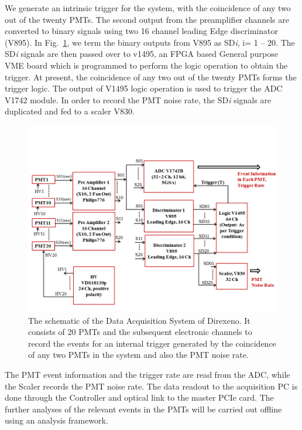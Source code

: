 We generate an intrinsic trigger for the system, 
with the coincidence of any two out of the twenty PMTs. The second output from the 
preamplifier channels are converted to binary signals using two 16 channel leading 
Edge discriminator (V895). In Fig.~\ref{Fig:DAQscheme}, we term the binary 
outputs from V895 as SD{\it i}, i= 1 -- 20. The SD{\it i} signals are then passed over to 
v1495, an FPGA based General purpose VME board which is programmed to perform the 
logic operation to obtain the trigger. At present, the coincidence of any two out 
of the twenty PMTs forms the trigger logic. The output of V1495 logic operation is 
used to trigger the ADC V1742 module. In order to record the PMT noise rate, the 
SD{\it i} signals are duplicated and fed to a scaler V830.


\begin{figure}
   \centering
   \includegraphics[width=\textwidth]{DAQscheme.png}
   \caption{The schematic of the Data Acquisition System of Direxeno. It 
        consists of 20 PMTs and the subsequent electronic channels to record 
        the events for an internal trigger generated by the coincidence of any 
        two PMTs in the system and also the PMT noise rate.}
   \label{Fig:DAQscheme}
\end{figure}

The PMT event information and the trigger rate are read from the ADC, while the Scaler 
records the PMT noise rate. The data readout to the acquisition PC is done through the 
Controller and optical link to the master PCIe card. The further analyses of the 
relevant events in the PMTs will be carried out offline using an analysis 
framework.





\clearpage %